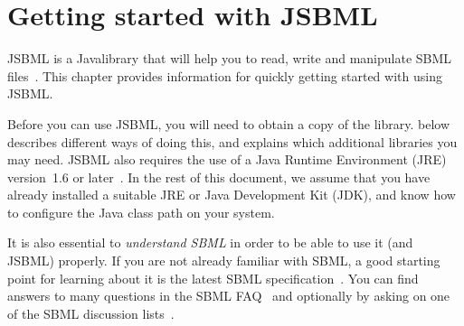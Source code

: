 \documentclass{JSBMLdoc}
\begin{document}


\maketitlepage
\maketableofcontents
\clearpage


\chapter{Getting started with JSBML}
\label{chp:getting-started}

JSBML is a Java\TTra library that will help you to read, write and
manipulate SBML files~\cite{Draeger2011a, Draeger2011b}. This chapter
provides information for quickly getting started with using JSBML.

Before you can use JSBML, you will need to obtain a copy of the library.
 below describes different ways of doing
this, and explains which additional libraries you may need. JSBML also
requires the use of a Java Runtime Environment (JRE) version~1.6 or
later~\cite{JavaDownloadURL}.  In the
rest of this document, we assume that you have already installed a suitable
JRE or Java Development Kit (JDK), and know how to configure the Java class
path on your system. 

It is also essential to \emph{understand SBML} in order to be able to use
it (and JSBML) properly. If you are not already familiar with SBML, a good
starting point for learning about it is the latest SBML
specification~\cite{SBMLspecs}. You can find answers to many questions in
the SBML FAQ~\cite{SBMLFAQ} and optionally by asking on one of the SBML
discussion lists~\cite{SBMLforums}.
\end{document}
